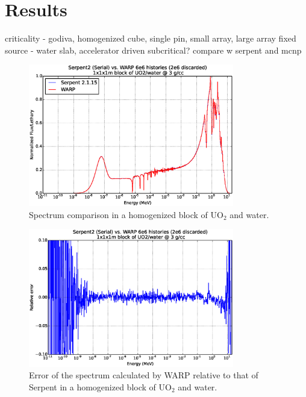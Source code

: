 \chapter{Results}
\label{chap:results}


criticality - godiva, homogenized cube, single pin,  small array, large array
fixed source - water slab, accelerator driven subcritical?
compare w serpent and mcnp

\begin{figure}[h!] 
\centering
\includegraphics[width=0.8\textwidth]{graphics/homfuel_spec.eps}
\caption{Spectrum comparison in a homogenized block of UO$_2$ and water. \label{homfuel_spec} }
\end{figure}

\begin{figure}[h!] 
\centering
\includegraphics[width=0.8\textwidth]{graphics/homfuel_spec_err.eps}
\caption{Error of the spectrum calculated by WARP relative to that of Serpent in a homogenized block of UO$_2$ and water. \label{homfuel_spec_err} }
\end{figure}

